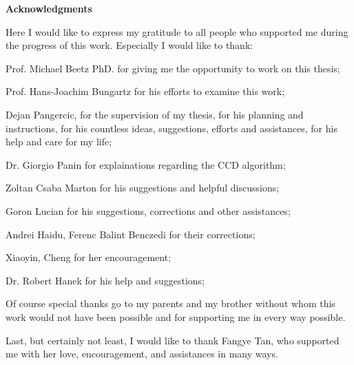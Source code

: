 \clearemptydoublepage
{}
{}        



\vspace*{2cm}

\begin{center}
{\Large \bf Acknowledgments}
\end{center}

\vspace{1cm}




Here I would like to express my gratitude to all people who supported me during the
progress of this work. Especially I would like to thank:

Prof. Michael Beetz PhD. for giving me the opportunity to work on this thesis;

Prof. Hans-Joachim Bungartz for his efforts to examine this work;

Dejan Pangercic, for the supervision of my thesis, for his planning and instructions,
for his countless ideas, suggestions, efforts and assistances, for his help and care for
my life;

Dr. Giorgio Panin for explainations regarding the CCD algorithm;

Zoltan Csaba Marton for his suggestions and helpful discussions;

Goron Lucian for his suggestions, corrections and other assistances;

Andrei Haidu, Ferenc Balint Benczedi for their corrections;

Xiaoyin, Cheng for her encouragement;

Dr. Robert Hanek for his help and suggestions;

Of course special thanks go to my parents and my brother without whom this work
would not have been possible and for supporting me in every way possible.

Last, but certainly not least, I would like to thank Fangye Tan, who supported me with her
love, encouragement, and assistances in many ways.
